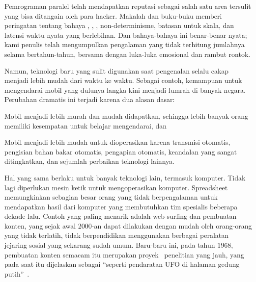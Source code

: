 
%

Pemrograman paralel telah mendapatkan reputasi sebagai salah satu area tersulit
yang bisa ditangain oleh para hacker. Makalah dan buku-buku memberi peringatan
tentang bahaya , , ,
non-determinisme, batasan  untuk skala, dan
latensi waktu nyata yang berlebihan. Dan bahaya-bahaya ini benar-benar nyata;
kami penulis telah mengumpulkan
pengalaman yang tidak terhitung jumlahnya selama bertahun-tahun, bersama dengan
luka-luka emosional dan rambut rontok.

Namun, teknologi baru yang sulit digunakan saat pengenalan selalu cakap menjadi
lebih mudah dari waktu ke waktu. Sebagai contoh, kemampuan untuk mengendarai
mobil yang dulunya langka kini menjadi lumrah di banyak negara. Perubahan
dramatis ini terjadi karena dua alasan dasar:
\begin{enumerate*}[(1)]
\item Mobil menjadi lebih murah dan mudah didapatkan, sehingga lebih banyak
orang memiliki kesempatan untuk belajar mengendarai, dan
\item Mobil menjadi lebih mudah untuk dioperasikan karena transmisi otomatis,
pengisian bahan bakar otomatis, pengapian otomatis, keandalan yang sangat
ditingkatkan, dan sejumlah perbaikan teknologi lainnya.
\end{enumerate*}

Hal yang sama berlaku untuk banyak teknologi lain, termasuk komputer. Tidak lagi
diperlukan mesin ketik untuk mengoperasikan komputer. Spreadsheet memungkinkan
sebagian besar orang yang tidak berpengalaman untuk mendapatkan hasil dari
komputer yang membutuhkan tim spesialis beberapa dekade lalu. Contoh yang paling
menarik adalah web-surfing dan pembuatan konten, yang sejak awal 2000-an dapat
dilakukan dengan mudah oleh orang-orang yang tidak terlatih, tidak berpendidikan
menggunakan berbagai peralatan jejaring sosial yang sekarang sudah umum.
Baru-baru ini, pada tahun 1968, pembuatan konten semacam itu merupakan
proyek~\cite{DouglasEngelbart1968} penelitian yang jauh, yang pada saat itu
dijelaskan sebagai ``seperti pendaratan UFO di halaman gedung
putih''~\cite{ScottGriffen2000}.

